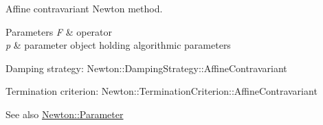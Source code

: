 Affine contravariant Newton method. 


\begin{DoxyParams}{Parameters}
{\em F} & operator \\
\hline
{\em p} & parameter object holding algorithmic parameters\\
\hline
\end{DoxyParams}

\begin{DoxyItemize}
\item Damping strategy\+: Newton\+::\+Damping\+Strategy\+::\+Affine\+Contravariant
\item Termination criterion\+: Newton\+::\+Termination\+Criterion\+::\+Affine\+Contravariant
\end{DoxyItemize}

\begin{DoxySeeAlso}{See also}
\hyperlink{structSpacy_1_1Newton_1_1Parameter}{Newton\+::\+Parameter} 
\end{DoxySeeAlso}
